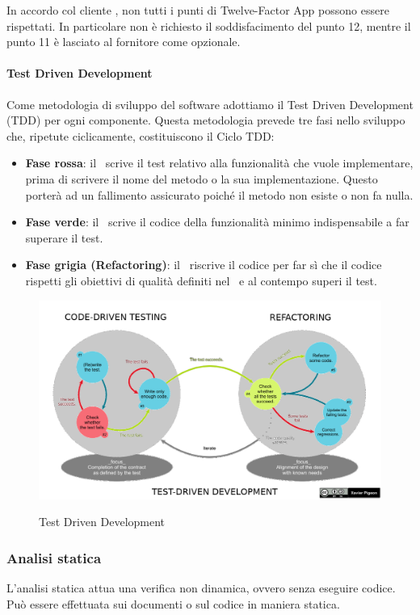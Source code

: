 		In accordo col cliente \II, non tutti i punti di Twelve-Factor App possono essere rispettati. In particolare non è richiesto il soddisfacimento del punto 12, mentre il punto 11 è lasciato al fornitore come opzionale.

		\paragraph{Test Driven Development}\label{tdd}
		Come metodologia di sviluppo del software adottiamo il Test Driven Development (TDD) per ogni componente.
		Questa metodologia prevede tre fasi nello sviluppo che, ripetute ciclicamente, costituiscono il Ciclo TDD:
		\begin{itemize}
			\item \textbf{Fase rossa}: il \Progr\ scrive il test relativo alla funzionalità che vuole implementare, prima di scrivere
				il nome del metodo o la sua implementazione. Questo porterà ad un fallimento assicurato poiché il metodo non esiste o non fa nulla.
			\item \textbf{Fase verde}: il \Progr\ scrive il codice della funzionalità minimo indispensabile a far superare il test.
			\item \textbf{Fase grigia (Refactoring)}: il \Progr\ riscrive il codice per far sì che il codice rispetti
				gli obiettivi di qualità definiti nel \PdQd\ e al contempo superi il test. 
		\end{itemize}

		\begin{figure}[H]
			\centering
			\includegraphics[width=\textwidth]{img/tdd.png}\\
			\caption{Test Driven Development}
		\end{figure}

		\subsubsection{Analisi statica}\label{AnalisiStatica}
		L'analisi statica attua una verifica non dinamica, ovvero senza eseguire codice.
		Può essere effettuata sui documenti o sul codice in maniera statica. 


